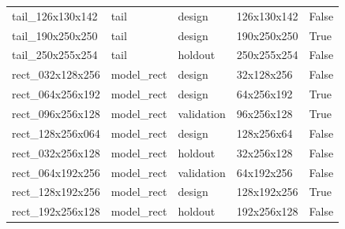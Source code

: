 \begin{tabular}{lllll}
tail\_126x130x142 & tail & design & 126x130x142 & False \\
tail\_190x250x250 & tail & design & 190x250x250 & True \\
tail\_250x255x254 & tail & holdout & 250x255x254 & False \\
rect\_032x128x256 & model\_rect & design & 32x128x256 & False \\
rect\_064x256x192 & model\_rect & design & 64x256x192 & True \\
rect\_096x256x128 & model\_rect & validation & 96x256x128 & True \\
rect\_128x256x064 & model\_rect & design & 128x256x64 & False \\
rect\_032x256x128 & model\_rect & holdout & 32x256x128 & False \\
rect\_064x192x256 & model\_rect & validation & 64x192x256 & False \\
rect\_128x192x256 & model\_rect & design & 128x192x256 & True \\
rect\_192x256x128 & model\_rect & holdout & 192x256x128 & False \\
\bottomrule
\end{tabular}
